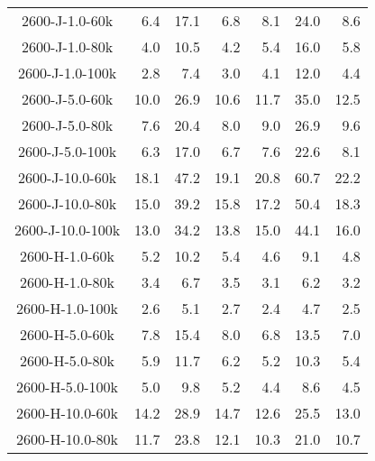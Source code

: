 \begin{longtable}{crrrrrr}
      2600-J-1.0-60k &         6.4 &        17.1 &         6.8 &            8.1 &           24.0 &            8.6 \\
      2600-J-1.0-80k &         4.0 &        10.5 &         4.2 &            5.4 &           16.0 &            5.8 \\
      2600-J-1.0-100k &         2.8 &         7.4 &         3.0 &            4.1 &           12.0 &            4.4 \\
      2600-J-5.0-60k &        10.0 &        26.9 &        10.6 &           11.7 &           35.0 &           12.5 \\
      2600-J-5.0-80k &         7.6 &        20.4 &         8.0 &            9.0 &           26.9 &            9.6 \\
      2600-J-5.0-100k &         6.3 &        17.0 &         6.7 &            7.6 &           22.6 &            8.1 \\
      2600-J-10.0-60k &        18.1 &        47.2 &        19.1 &           20.8 &           60.7 &           22.2 \\
      2600-J-10.0-80k &        15.0 &        39.2 &        15.8 &           17.2 &           50.4 &           18.3 \\
      2600-J-10.0-100k &        13.0 &        34.2 &        13.8 &           15.0 &           44.1 &           16.0 \\
      2600-H-1.0-60k &         5.2 &        10.2 &         5.4 &            4.6 &            9.1 &            4.8 \\
      2600-H-1.0-80k &         3.4 &         6.7 &         3.5 &            3.1 &            6.2 &            3.2 \\
      2600-H-1.0-100k &         2.6 &         5.1 &         2.7 &            2.4 &            4.7 &            2.5 \\
      2600-H-5.0-60k &         7.8 &        15.4 &         8.0 &            6.8 &           13.5 &            7.0 \\
      2600-H-5.0-80k &         5.9 &        11.7 &         6.2 &            5.2 &           10.3 &            5.4 \\
      2600-H-5.0-100k &         5.0 &         9.8 &         5.2 &            4.4 &            8.6 &            4.5 \\
      2600-H-10.0-60k &        14.2 &        28.9 &        14.7 &           12.6 &           25.5 &           13.0 \\
      2600-H-10.0-80k &        11.7 &        23.8 &        12.1 &           10.3 &           21.0 &           10.7 \\

\end{longtable}
